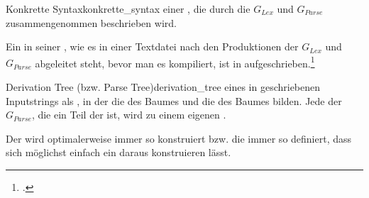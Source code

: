 \begin{Definition}{Konkrette Syntax}{konkrette_syntax}
   einer , die durch die  $G_{Lex}$ und $G_{Parse}$ zusammengenommen beschrieben wird.

  Ein  in seiner , wie es in einer Textdatei nach den Produktionen der  $G_{Lex}$ und $G_{Parse}$ abgeleitet steht, bevor man es kompiliert, ist in  aufgeschrieben.\footcite{noauthor_course_2022}
\end{Definition}

\begin{Definition}{Derivation Tree (bzw. Parse Tree)}{derivation_tree}
   eines in  geschriebenen Inputstrings als , in der  die  des Baumes und  die  des Baumes bilden. Jede  der  $G_{Parse}$, die ein Teil der  ist,  wird zu einem eigenen .

  Der  wird optimalerweise immer so konstruiert bzw. die  immer so definiert, dass sich möglichst einfach ein  daraus konstruieren lässt.

\end{Definition}

